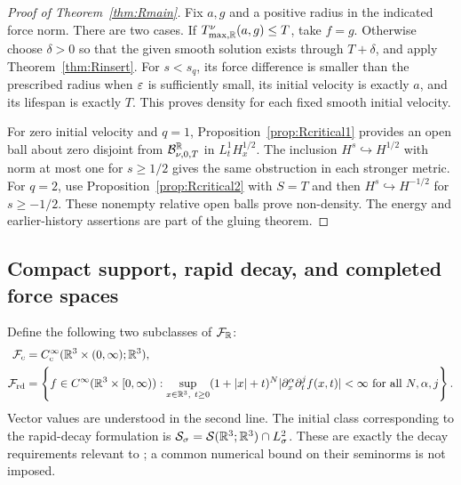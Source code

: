 \begin{proof}[Proof of Theorem~\ref{thm:Rmain}]
Fix $a,g$ and a positive radius in the indicated force norm. There are two cases. If $T^\nu_{\max,\mathbb R}(a,g)\le T$, take $f=g$. Otherwise choose $\delta>0$ so that the given smooth solution exists through $T+\delta$, and apply Theorem~\ref{thm:Rinsert}. For $s<s_q$, its force difference is smaller than the prescribed radius when $\varepsilon$ is sufficiently small, its initial velocity is exactly $a$, and its lifespan is exactly $T$. This proves density for each fixed smooth initial velocity.

For zero initial velocity and $q=1$, Proposition~\ref{prop:Rcritical1} provides an open ball about zero disjoint from $\mathcal B^\mathbb R_{\nu,0,T}$ in $L^1_tH^{1/2}_x$. The inclusion $H^s\hookrightarrow H^{1/2}$ with norm at most one for $s\ge1/2$ gives the same obstruction in each stronger metric. For $q=2$, use Proposition~\ref{prop:Rcritical2} with $S=T$ and then $H^s\hookrightarrow H^{-1/2}$ for $s\ge-1/2$. These nonempty relative open balls prove non-density. The energy and earlier-history assertions are part of the gluing theorem.
\end{proof}

\subsection{Compact support, rapid decay, and completed force spaces}
Define the following two subclasses of $\mathcal F_{\mathbb R}$:
\begin{align*}
 \mathcal F_c&=C_c^\infty(\mathbb R^3\times(0,\infty);\mathbb R^3),\\
 \mathcal F_{\mathrm{rd}}
 &=\left\{f\in C^\infty(\mathbb R^3\times[0,\infty)):
 \sup_{x\in\mathbb R^3,\ t\ge0}(1+|x|+t)^N
       |\partial_x^\alpha\partial_t^jf(x,t)|<\infty
 \text{ for all }N,\alpha,j\right\}.
\end{align*}
Vector values are understood in the second line. The initial class corresponding to the rapid-decay formulation is $\mathcal S_\sigma=\mathcal S(\mathbb R^3;\mathbb R^3)\cap L^2_\sigma$. These are exactly the decay requirements relevant to \cite[equations (4)--(5)]{clay}; a common numerical bound on their seminorms is not imposed.

